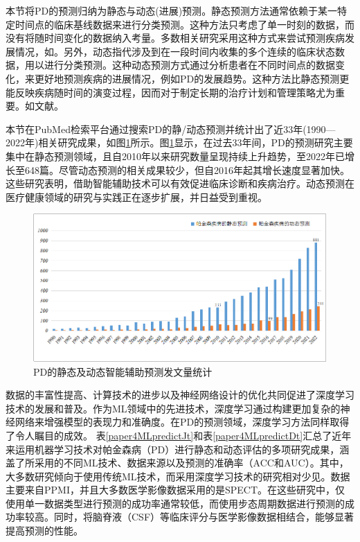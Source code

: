 本节将PD的预测归纳为静态与动态(进展)预测\cite{jyWen}。静态预测方法通常依赖于某一特定时间点的临床基线数据来进行分类预测。这种方法只考虑了单一时刻的数据，而没有将随时间变化的数据纳入考量。多数相关研究采用这种方式来尝试预测疾病发展情况，如\cite{sivaranjini2020deep,martinez2018convolutional,kim2018artificial,castillo2018robust,al2021feature,almeida2019detecting,nahar2021feature,patra2019prediction,wang2020early,prashanth2016high,grover2018predicting,masud2021crowd,pahuja2022deep}。另外，动态指代涉及到在一段时间内收集的多个连续的临床状态数据，用以进行分类预测。这种动态预测方式通过分析患者在不同时间点的数据变化，来更好地预测疾病的进展情况，例如PD的发展趋势。这种方法比静态预测更能反映疾病随时间的演变过程，因而对于制定长期的治疗计划和管理策略尤为重要。如文献\cite{latourelle2017large,simuni2016predictors,nilashi2020remote,bi2021novel,lei2017joint,kiryu2019deep,adams2021improved,khoury2019data,khoury2018cdtw,prince2018multi}。

本节在PubMed检索平台通过搜索PD的静/动态预测并统计出了近33年(1990—2022年)相关研究成果，如图\ref{paper4JinDongTai}所示。图\ref{paper4JinDongTai}显示，在过去33年间，PD的预测研究主要集中在静态预测领域，且自2010年以来研究数量呈现持续上升趋势，至2022年已增长至648篇。尽管动态预测的相关成果较少，但自2016年起其增长速度显著加快。这些研究表明，借助智能辅助技术可以有效促进临床诊断和疾病治疗。动态预测在医疗健康领域的研究与实践正在逐步扩展，并日益受到重视。

    \begin{figure}[htbp]
      \centering
      \includegraphics[width=0.9\linewidth]{figs/paper4JinDongTai.png}
      \caption{PD的静态及动态智能辅助预测发文量统计}\label{paper4JinDongTai}
     \end{figure} 

数据的丰富性提高、计算技术的进步以及神经网络设计的优化共同促进了深度学习技术的发展和普及。作为ML领域中的先进技术，深度学习通过构建更加复杂的神经网络来增强模型的表现力和准确度。在PD的预测领域，深度学习方法同样取得了令人瞩目的成效\cite{sivaranjini2020deep,prashanth2016high,vaiciukynas2017detecting,naranjo2016addressing,masud2021crowd,pahuja2022deep,sharanyaa2022optimized,oh2020deep,adams2021improved}。
表\ref{paper4MLpredictJt}和表\ref{paper4MLpredictDt}汇总了近年来运用机器学习技术对帕金森病（PD）进行静态和动态评估的多项研究成果，涵盖了所采用的不同ML技术、数据来源以及预测的准确率（ACC和AUC）。其中，大多数研究倾向于使用传统ML技术，而采用深度学习技术的研究相对少见。数据主要来自PPMI，并且大多数医学影像数据采用的是SPECT。在这些研究中，仅使用单一数据类型进行预测的成功率通常较低，而使用步态周期数据进行预测的成功率较高。同时，将脑脊液（CSF）等临床评分与医学影像数据相结合，能够显著提高预测的性能。


